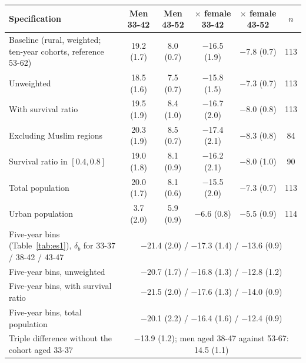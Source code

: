 \begin{tabular}{lccccc}
\toprule
Specification & Men 33-42 & Men 43-52 & $\times$ female 33-42 & $\times$ female 43-52 & $n$ \\
\midrule
Baseline (rural, weighted; ten-year cohorts, reference 53-62) & 19.2 (1.7) & 8.0 (0.7) & $-$16.5 (1.9) & $-$7.8 (0.7) & 113 \\
Unweighted & 18.5 (1.6) & 7.5 (0.7) & $-$15.8 (1.5) & $-$7.3 (0.7) & 113 \\
With survival ratio & 19.5 (1.9) & 8.4 (1.0) & $-$16.7 (2.0) & $-$8.0 (0.8) & 113 \\
Excluding Muslim regions & 20.3 (1.9) & 8.5 (0.7) & $-$17.4 (2.1) & $-$8.3 (0.8) & 84 \\
Survival ratio in $[0.4, 0.8]$ & 19.0 (1.8) & 8.1 (0.9) & $-$16.2 (2.1) & $-$8.0 (1.0) & 90 \\
Total population & 20.0 (1.7) & 8.1 (0.6) & $-$15.5 (2.0) & $-$7.3 (0.7) & 113 \\
Urban population & 3.7 (2.0) & 5.9 (0.9) & $-$6.6 (0.8) & $-$5.5 (0.9) & 114 \\
\midrule
Five-year bins (Table~\ref{tab:es1}), $\delta_b$ for 33-37 / 38-42 / 43-47 & \multicolumn{5}{c}{$-$21.4 (2.0) / $-$17.3 (1.4) / $-$13.6 (0.9)} \\
Five-year bins, unweighted & \multicolumn{5}{c}{$-$20.7 (1.7) / $-$16.8 (1.3) / $-$12.8 (1.2)} \\
Five-year bins, with survival ratio & \multicolumn{5}{c}{$-$21.5 (2.0) / $-$17.6 (1.3) / $-$14.0 (0.9)} \\
Five-year bins, total population & \multicolumn{5}{c}{$-$20.1 (2.2) / $-$16.4 (1.6) / $-$12.4 (0.9)} \\
Triple difference without the cohort aged 33-37 & \multicolumn{5}{c}{$-$13.9 (1.2); men aged 38-47 against 53-67: 14.5 (1.1)} \\
\bottomrule
\end{tabular}
